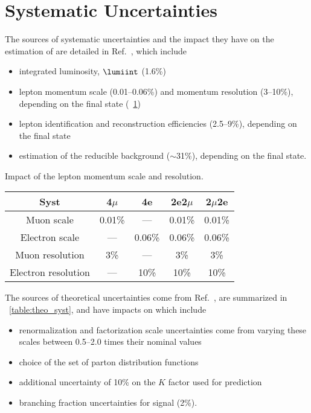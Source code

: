 \section{Systematic Uncertainties}
\label{sec:syst_uncert}
The sources of systematic uncertainties and the impact they have on the estimation of \mfourl are detailed in Ref.~\cite{HIG_21_019}, which include
\begin{itemize}
	\item integrated luminosity, $\lumiint$ (1.6\%)~\cite{LUM_17_003, LUM_17_004, LUM_18_002}
	\item lepton momentum scale (0.01--0.06\%) and momentum resolution (3--10\%), depending on the final state (\tablename~\ref{table:ScaleRes_syst})
	\item lepton identification and reconstruction efficiencies (2.5--9\%), depending on the final state
	\item estimation of the reducible background ($\sim$31\%), depending on the final state.
\end{itemize}
\begin{table}[ht]
	\begin{center}
		\topcaption
		{Impact of the lepton momentum scale and resolution.}
                \begin{tabular}{ccccc}
		\hline
		Syst	&	4$\mu$	&	4e	&	2e2$\mu$	&	2$\mu$2e	\\
		\hline
		Muon scale	&	0.01\%	&	---	&	0.01\%	&	0.01\%	\\
		Electron scale	&	---	&	0.06\%	&	0.06\%	&	0.06\%	\\
		\hline
		Muon resolution	&	3\%	&	---	&	3\%	&	3\%	\\
		Electron resolution	&	---	&	10\%	&       10\%&       10\%	\\
		\hline
		\end{tabular}
		\label{table:ScaleRes_syst}
	\end{center}
\end{table}
The sources of theoretical uncertainties come from Ref.~\cite{HIG_19_001},
are summarized in \tablename~\ref{table:theo_syst},
and have impacts on \mfourl which include
\begin{itemize}
	\item renormalization and factorization scale uncertainties come from varying these scales between 0.5--2.0 times their nominal values
	\item choice of the set of parton distribution functions~\cite{Alekhin:2011sk, Botje:2011sn}
	\item additional uncertainty of 10\% on the $K$ factor used for \ggzzfourl prediction
	\item branching fraction uncertainties for \hzzfourl signal (2\%).
\end{itemize}
